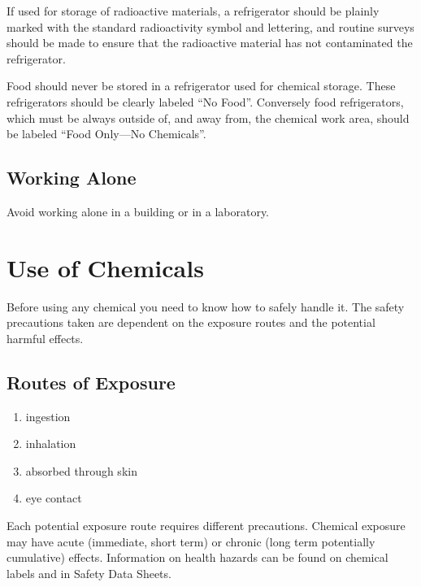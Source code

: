\documentclass[letterpaper,10pt,english]{sphinxmanual}
\begin{document}
If used for storage of radioactive materials, a refrigerator should be plainly marked with the standard radioactivity symbol and lettering, and routine surveys should be made to ensure that the radioactive material has not contaminated the refrigerator.

Food should never be stored in a refrigerator used for chemical storage. These refrigerators should be clearly labeled “No Food”. Conversely food refrigerators, which must be always outside of, and away from, the chemical work area, should be labeled “Food Only—No Chemicals”.


\subsection{Working Alone}
\label{\detokenize{Laboratory_Safety/Laboratory_Safety:working-alone}}
Avoid working alone in a building or in a laboratory.


\section{Use of Chemicals}
\label{\detokenize{Laboratory_Safety/Laboratory_Safety:use-of-chemicals}}\label{\detokenize{Laboratory_Safety/Laboratory_Safety:heading-laboratory-safety-use-of-chemicals}}
Before using any chemical you need to know how to safely handle it. The safety precautions taken are dependent on the exposure routes and the potential harmful effects.


\subsection{Routes of Exposure}
\label{\detokenize{Laboratory_Safety/Laboratory_Safety:routes-of-exposure}}\begin{enumerate}
\item {} 
ingestion

\item {} 
inhalation

\item {} 
absorbed through skin

\item {} 
eye contact

\end{enumerate}

Each potential exposure route requires different precautions. Chemical exposure may have acute (immediate, short term) or chronic (long term potentially cumulative) effects. Information on health hazards can be found on chemical labels and in Safety Data Sheets.
\end{document}
